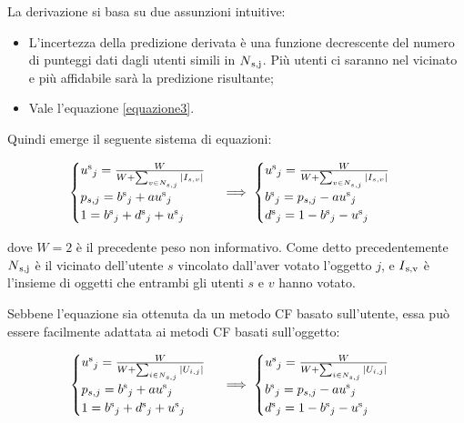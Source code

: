 \documentclass[letterpaper]{article} %
\begin{document}
La derivazione si basa su due assunzioni intuitive:

\begin{itemize}
	\item
	L'incertezza della predizione derivata è una funzione decrescente del
	numero di punteggi dati dagli utenti simili in $N\textsubscript{s,j}$. Più utenti ci
	saranno nel vicinato e più affidabile sarà la predizione risultante;
	\item
	Vale l'equazione \eqref{equazione3}.
\end{itemize}

Quindi emerge il seguente sistema di equazioni:

\begin{center}
	\begin{equation}
	\begin{cases}
	u\textsuperscript{s}_j=\frac{W}{W+\sum_{v \in N_{s,j}}|I_{s,v}|}\\
	p_{s,j}=b\textsuperscript{s}_j+au\textsuperscript{s}_j\\
	1=b\textsuperscript{s}_j+d\textsuperscript{s}_j+u\textsuperscript{s}_j
	\end{cases} \implies 
	\begin{cases}
	u\textsuperscript{s}_j=\frac{W}{W+\sum_{v \in N_{s,j}}|I_{s,v}|}\\
	b\textsuperscript{s}_j=p_{s,j}-au\textsuperscript{s}_j\\
	d\textsuperscript{s}_j=1-b\textsuperscript{s}_j-u\textsuperscript{s}_j
	\end{cases} \label{equazione9}
	\end{equation}
\end{center}

dove $W = 2$ è il precedente peso non informativo. Come detto
precedentemente $N\textsubscript{s,j}$ è il vicinato dell'utente $s$ vincolato dall'aver
votato l'oggetto $j$, e $I\textsubscript{s,v}$ è l'insieme di oggetti che entrambi gli
utenti $s$ e $v$ hanno votato.

Sebbene l'equazione sia ottenuta da un metodo CF basato sull'utente,
essa può essere facilmente adattata ai metodi CF basati sull'oggetto:

\begin{center}
	\begin{equation}
	\begin{cases}
	u\textsuperscript{s}_j=\frac{W}{W+\sum_{i \in N_{s,j}}|U_{i,j}|}\\
	p_{s,j}=b\textsuperscript{s}_j+au\textsuperscript{s}_j\\
	1=b\textsuperscript{s}_j+d\textsuperscript{s}_j+u\textsuperscript{s}_j
	\end{cases} \implies 
	\begin{cases}
	u\textsuperscript{s}_j=\frac{W}{W+\sum_{i \in N_{s,j}}|U_{i,j}|}\\
	b\textsuperscript{s}_j=p_{s,j}-au\textsuperscript{s}_j\\
	d\textsuperscript{s}_j=1-b\textsuperscript{s}_j-u\textsuperscript{s}_j
	\end{cases} \label{equazione10}
	\end{equation}
\end{center}
\end{document}
